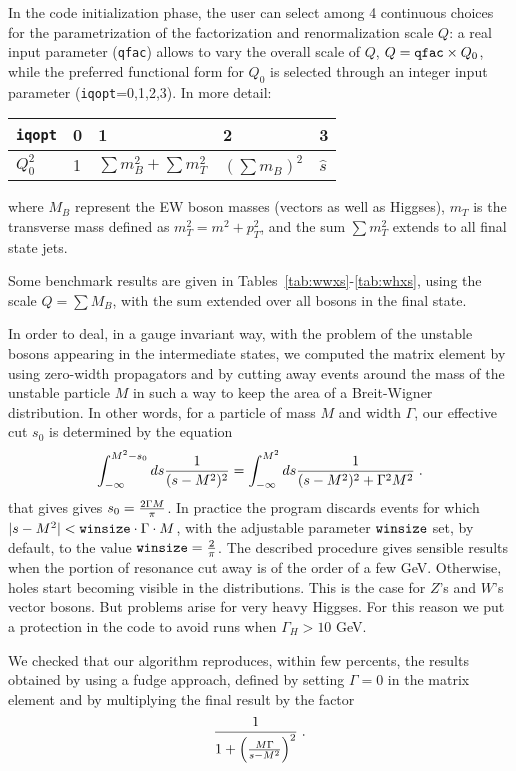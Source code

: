 \documentclass[paper]{JHEP3}
\newcommand{\bqa}{\begin{eqnarray}}
\newcommand{\eqa}{\end{eqnarray}}
\def    \frac           #1#2{{#1 \over #2}}
\def    \ptsq           {\mbox{$p^2_T$}}
\def    \mT             {\mbox{$m_T$}}
\def    \mTsq           {\mbox{$m^2_T$}}
\begin{document}
In the code initialization phase, the user can select among 4
continuous choices for the parametrization of the factorization and
renormalization scale $Q$: a real input parameter ({\tt qfac}) allows
to vary the overall scale of $Q$, $Q={\tt qfac}\times Q_0$, while the
preferred functional form for $Q_0$ is selected through an integer
input parameter ({\tt iqopt}=0,1,2,3).  In more detail:
{\renewcommand{\arraystretch}{1.2}
\begin{center}
\begin{tabular}{l||l|l|l|l|}
{\tt iqopt} & 0 & 1 & 2 & 3 \\  \hline
$Q_0^2$ & 1 & $\sum m_B^2+ \sum \mTsq$ & $(\sum m_B)^2$ & ${\hat{s}}$ 
\end{tabular}
\end{center}
}
where $M_B$ represent the EW boson masses (vectors as well as
Higgses), $\mT$ is the transverse mass defined as $\mTsq=m^2+\ptsq$,
and the sum $\sum \mTsq $ extends to all final
state jets.

Some benchmark results are given in
Tables~\ref{tab:wwxs}-\ref{tab:whxs}, using the scale $Q = \sum M_B$,
with the sum extended over all bosons in the final state.

In order to deal, in a gauge invariant way, with the problem of the 
unstable bosons appearing in the intermediate states, we computed 
the matrix element by using zero-width propagators and by
cutting away events around the mass of the unstable particle 
$M$ in such a way to keep the area of a Breit-Wigner distribution.
In other words, for a particle of mass 
$M$ and width $\Gamma$, our effective cut $s_0$ 
is determined by the equation  
\bqa
\int_{-\infty}^{M^2-s_0} ds \frac{1}{(s-M^2)^2} = 
\int_{-\infty}^{M^2} ds \frac{1}{(s-M^2)^2+\Gamma^2 M^2} \; .
\eqa
that gives gives $s_0= \frac{2\Gamma M}{\pi}$. In practice the 
program discards events for which $|s-M^2| < {\tt winsize}\cdot \Gamma 
\cdot M$, with the adjustable parameter ${\tt winsize}$ set, by
default, to the value ${\tt winsize}= \frac{2}{\pi}$.
The described procedure gives sensible results 
when the portion of resonance cut away is of the order of a few GeV. 
Otherwise, holes start becoming visible in the distributions.
This is the case for $Z$'s and $W$'s vector bosons. But problems arise
for very heavy Higgses. For this reason we put a protection in the code
to avoid runs when $\Gamma_H > 10$ GeV.

We checked that our algorithm reproduces, within few percents, 
the results obtained by using a fudge approach, defined by setting
$\Gamma= 0$ in the matrix element and by multiplying
the final result by the factor 
$$ \frac{1}{1+\left(\frac{M\Gamma}{s-M^2}\right)^2}\; .$$
\end{document}
